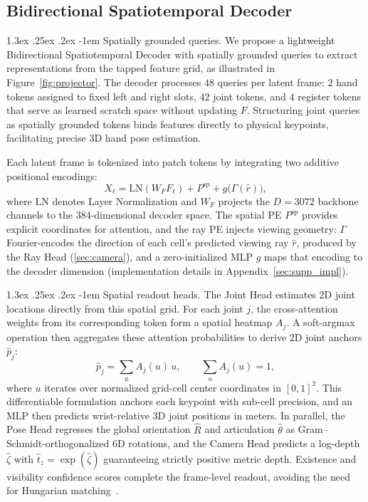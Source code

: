 \documentclass[10pt,twocolumn,letterpaper]{article}
\makeatletter
\renewcommand\paragraph{\@startsection{paragraph}{4}{\z@}%
  {1.3ex \@plus .25ex \@minus .2ex}%
  {-1em}%
  {\normalfont\normalsize\bfseries}}
\makeatother
\begin{document}
\subsection{Bidirectional Spatiotemporal Decoder}
\label{sec:decoder}

\paragraph{Spatially grounded queries.}
We propose a lightweight Bidirectional Spatiotemporal Decoder with spatially grounded queries to extract representations from the tapped feature grid, as illustrated in Figure~\ref{fig:projector}. The decoder processes $48$ queries per latent frame: $2$ hand tokens assigned to fixed left and right slots, $42$ joint tokens, and $4$ register tokens that serve as learned scratch space without updating $F$. Structuring joint queries as spatially grounded tokens binds features directly to physical keypoints, facilitating precise 3D hand pose estimation.

Each latent frame is tokenized into patch tokens by integrating two additive positional encodings:
\begin{equation}
X_\ell = \mathrm{LN}(W_F F_\ell) + P^{\mathrm{sp}} + g\big(\Gamma(\hat r)\big),
\label{eq:token}
\end{equation}
where $\mathrm{LN}$ denotes Layer Normalization and $W_F$ projects the $D=3072$ backbone channels to the 384-dimensional decoder space. The spatial PE $P^{\mathrm{sp}}$ provides explicit coordinates for attention, and the ray PE injects viewing geometry: $\Gamma$ Fourier-encodes the direction of each cell's predicted viewing ray $\hat r$, produced by the Ray Head (\cref{sec:camera}), and a zero-initialized MLP $g$ maps that encoding to the decoder dimension (implementation details in Appendix~\ref{sec:supp_impl}).

\paragraph{Spatial readout heads.}
The Joint Head estimates 2D joint locations directly from this spatial grid. For each joint $j$, the cross-attention weights from its corresponding token form a spatial heatmap $A_j$. A soft-argmax operation then aggregates these attention probabilities to derive 2D joint anchors $\hat p_j$:
\begin{equation}
\hat p_j = \sum_{u} A_j(u)\,u, \qquad \sum_{u} A_j(u)=1,
\label{eq:softargmax}
\end{equation}
where $u$ iterates over normalized grid-cell center coordinates in $[0,1]^2$. This differentiable formulation anchors each keypoint with sub-cell precision, and an MLP then predicts wrist-relative 3D joint positions in meters. In parallel, the Pose Head regresses the global orientation $\hat R$ and articulation $\hat\theta$ as Gram--Schmidt-orthogonalized 6D rotations, and the Camera Head predicts a log-depth $\hat\zeta$ with $\hat t_z = \exp(\hat\zeta)$ guaranteeing strictly positive metric depth. Existence and visibility confidence scores complete the frame-level readout, avoiding the need for Hungarian matching~\citep{kuhn1955,detr2020}.
\end{document}
